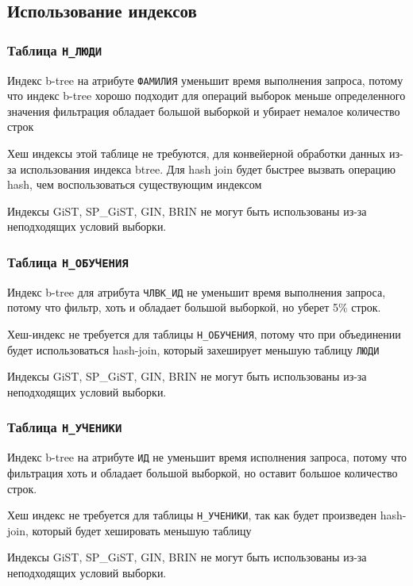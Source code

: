 \documentclass[12pt]{article}
\begin{document}
	\subsection{Использование индексов}

	\subsubsection*{Таблица \texttt{Н_ЛЮДИ}}
	
	Индекс b-tree на атрибуте \texttt{ФАМИЛИЯ} уменьшит время выполнения запроса, потому что индекс b-tree хорошо подходит для операций выборок меньше определенного значения фильтрация обладает большой выборкой и убирает немалое количество строк 
	
	Хеш индексы этой таблице не требуются, для конвейерной обработки данных из-за использования индекса btree. Для hash join будет быстрее вызвать операцию hash, чем воспользоваться существующим индексом
	
	Индексы GiST, SP_GiST, GIN, BRIN не могут быть использованы из-за неподходящих условий выборки.  
	
	\subsubsection*{Таблица \texttt{Н_ОБУЧЕНИЯ}}
	
	
	Индекс b-tree для атрибута \texttt{ЧЛВК_ИД} не уменьшит время выполнения запроса, потому что фильтр, хоть и обладает большой выборкой, но уберет 5\% строк.
	
	Хеш-индекс не требуется для таблицы \texttt{Н_ОБУЧЕНИЯ}, потому что при объединении будет использоваться hash-join, который захеширует меньшую таблицу \texttt{ЛЮДИ}
	
	Индексы GiST, SP_GiST, GIN, BRIN не могут быть использованы из-за неподходящих условий выборки.  
	
	\subsubsection*{Таблица \texttt{Н_УЧЕНИКИ}}
	
	
	Индекс b-tree на атрибуте \texttt{ИД} не уменьшит время исполнения запроса, потому что фильтрация хоть и обладает большой выборкой, но оставит большое количество строк.
	
	Хеш индекс не требуется для таблицы \texttt{Н_УЧЕНИКИ}, так как будет произведен hash-join, который будет хешировать меньшую таблицу
	
	Индексы GiST, SP_GiST, GIN, BRIN не могут быть использованы из-за неподходящих условий выборки.  
	
\end{document}
